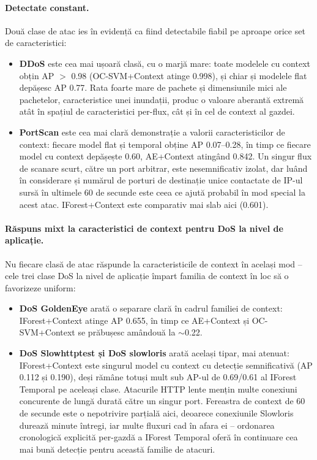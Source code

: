 \paragraph{Detectate constant.} Două clase de atac ies în evidență ca fiind detectabile fiabil pe aproape orice set de caracteristici:

\begin{itemize}
  \item \textbf{DDoS} este cea mai ușoară clasă, cu o marjă mare: toate modelele cu context obțin AP $>$ 0.98 (OC-SVM+Context atinge 0.998), și chiar și modelele flat depășesc AP 0.77. Rata foarte mare de pachete și dimensiunile mici ale pachetelor, caracteristice unei inundații, produc o valoare aberantă extremă atât în spațiul de caracteristici per-flux, cât și în cel de context al gazdei.
  \item \textbf{PortScan} este cea mai clară demonstrație a valorii caracteristicilor de context: fiecare model flat și temporal obține AP 0.07--0.28, în timp ce fiecare model cu context depășește 0.60, AE+Context atingând 0.842. Un singur flux de scanare scurt, către un port arbitrar, este nesemnificativ izolat, dar luând în considerare și numărul de porturi de destinație unice contactate de IP-ul sursă în ultimele 60 de secunde este ceea ce ajută probabil în mod special la acest atac. IForest+Context este comparativ mai slab aici (0.601).
\end{itemize}

\paragraph{Răspuns mixt la caracteristici de context pentru DoS la nivel de aplicație.} Nu fiecare clasă de atac răspunde la caracteristicile de context în același mod -- cele trei clase DoS la nivel de aplicație împart familia de context în loc să o favorizeze uniform:

\begin{itemize}
  \item \textbf{DoS GoldenEye} arată o separare clară în cadrul familiei de context: IForest+Context atinge AP 0.655, în timp ce AE+Context și OC-SVM+Context se prăbușesc amândouă la $\sim$0.22.
  \item \textbf{DoS Slowhttptest și DoS slowloris} arată același tipar, mai atenuat: IForest+Context este singurul model cu context cu detecție semnificativă (AP 0.112 și 0.190), deși rămâne totuși mult sub AP-ul de 0.69/0.61 al IForest Temporal pe aceleași clase. Atacurile HTTP lente mențin multe conexiuni concurente de lungă durată către un singur port. Fereastra de context de 60 de secunde este o nepotrivire parțială aici, deoarece conexiunile Slowloris durează minute întregi, iar multe fluxuri cad în afara ei -- ordonarea cronologică explicită per-gazdă a IForest Temporal oferă în continuare cea mai bună detecție pentru această familie de atacuri.
\end{itemize}

